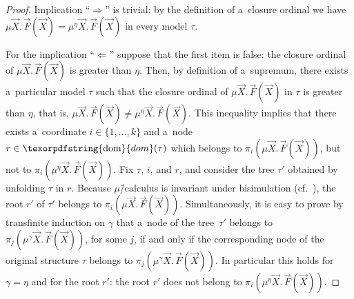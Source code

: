 \documentclass[11pt,a4paper]{amsart}
\theoremstyle{plain}
\theoremstyle{definition}
\theoremstyle{defC}
\theoremstyle{thmC}
\theoremstyle{plain}
\numberwithin{equation}{section}
\numberwithin{equation}{section}
\numberwithin{figure}{section}
\newcommand{\ident}[1]{\ensuremath{\texorpdfstring{\mathrm{\mathnm{#1}}}{#1}}\xspace}
\newcommand{\dom}{\ident{dom}}
\newcommand{\mathnm}[1]{#1}
\begin{document}
\begin{proof}
	Implication ``$\Rightarrow$'' is trivial: by the definition of a~closure ordinal we have $\mu\vec{X}.\,\vec{F}(\vec{X})=\mu^\eta\vec{X}.\,\vec{F}(\vec{X})$ in every model $\tau$.
	
	For the implication ``$\Leftarrow$'' suppose that the first item is false: the closure ordinal of $\mu\vec{X}.\,\vec{F}(\vec{X})$ is greater than $\eta$.
	Then, by definition of a~supremum, there exists a~particular model $\tau$ such that the closure ordinal of $\mu\vec{X}.\,\vec{F}(\vec{X})$ in $\tau$ is greater than $\eta$,
	that is, $\mu\vec{X}.\,\vec{F}(\vec{X})\neq\mu^\eta\vec{X}.\,\vec{F}(\vec{X})$.
	This inequality implies that there exists a~coordinate $i\in\{1,\dots,k\}$ and a~node $r\in\dom(\tau)$ which belongs to $\pi_i(\mu\vec{X}.\,\vec{F}(\vec{X}))$, but not to $\pi_i(\mu^\eta\vec{X}.\,\vec{F}(\vec{X}))$.
	Fix $\tau$, $i$, and $r$, and consider the tree $\tau'$ obtained by unfolding $\tau$ in $r$.
	Because $\mu$\=/calculus is invariant under bisimulation
	(cf.~\cite[Section~26.3.1]{julian-igor-handook}), the root $r'$ of $\tau'$ belongs to $\pi_i(\mu\vec{X}.\,\vec{F}(\vec{X}))$.
	Simultaneously, it is easy to prove by transfinite induction on $\gamma$ that a~node of the tree~$\tau'$ belongs to $\pi_j(\mu^\gamma\vec{X}.\,\vec{F}(\vec{X}))$, for some $j$,
	if and only if the corresponding node of the original structure $\tau$ belongs to $\pi_j(\mu^\gamma\vec{X}.\,\vec{F}(\vec{X}))$.
	In particular this holds for $\gamma=\eta$ and for the root $r'$: the root $r'$ does not belong to $\pi_i(\mu^\eta\vec{X}.\,\vec{F}(\vec{X}))$.
	

\end{proof}
\end{document}
